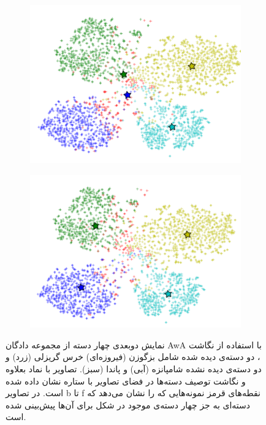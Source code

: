 \begin{figure}[t]
\begin{subfigure}[b]{0.27\linewidth}
    \includegraphics[width=\linewidth]{images/own_cluster}
    \caption{}
    \label{fig:clustering}
  \end{subfigure}
%
  \begin{subfigure}[b]{0.27\linewidth}
    \includegraphics[width=\linewidth]{images/jeac}
    \caption{}
    \label{fig:jeac}
  \end{subfigure}
  \caption[تحلیل قسمت‌های مختلف روش پیشنهادی]{
  نمایش دوبعدی چهار دسته از مجموعه دادگان AwA با استفاده از نگاشت ، دو دسته‌ی دیده شده شامل بزگوزن (فیروزه‌ای) خرس گریزلی (زرد) و دو دسته‌ی دیده نشده شامپانزه (آبی) و پاندا (سبز). تصاویر با نماد بعلاوه و نگاشت توصیف دسته‌ها در فضای تصاویر با ستاره نشان داده شده است. در تصاویر b تا f نقطه‌های قرمز نمونه‌هایی که را نشان می‌دهد که دسته‌ای به جز چهار دسته‌ی موجود در شکل برای آن‌ها پیش‌بینی شده است.
}
\end{figure}
